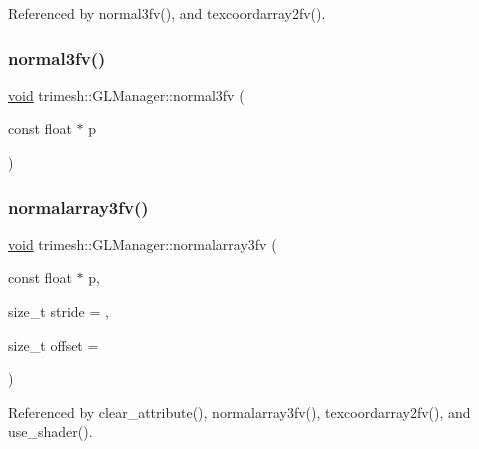 Referenced by normal3fv(), and texcoordarray2fv().

\mbox{\label{classtrimesh_1_1GLManager_a90221eeacad5f590d8a8fedf186ebc0a}} 
\subsubsection{\texorpdfstring{normal3fv()}{normal3fv()}}
{\footnotesize\ttfamily \hyperlink{namespacetrimesh_a784ddfd979e1c579bda795a8edfc3f43}{void} trimesh\+::\+G\+L\+Manager\+::normal3fv (\begin{DoxyParamCaption}\item[{const float $\ast$}]{p }\end{DoxyParamCaption})\hspace{0.3cm}{\ttfamily [inline]}}

\mbox{\label{classtrimesh_1_1GLManager_a7a9fce4c004775be7a49e8a748134882}} 
\subsubsection{\texorpdfstring{normalarray3fv()}{normalarray3fv()}\hspace{0.1cm}{\footnotesize\ttfamily [1/3]}}
{\footnotesize\ttfamily \hyperlink{namespacetrimesh_a784ddfd979e1c579bda795a8edfc3f43}{void} trimesh\+::\+G\+L\+Manager\+::normalarray3fv (\begin{DoxyParamCaption}\item[{const float $\ast$}]{p,  }\item[{size\+\_\+t}]{stride = {},  }\item[{size\+\_\+t}]{offset = {} }\end{DoxyParamCaption})}



Referenced by clear\+\_\+attribute(), normalarray3fv(), texcoordarray2fv(), and use\+\_\+shader().

\mbox{\label{classtrimesh_1_1GLManager_acba59f3ebb1e80ce6d0c68596c8234bb}} 
